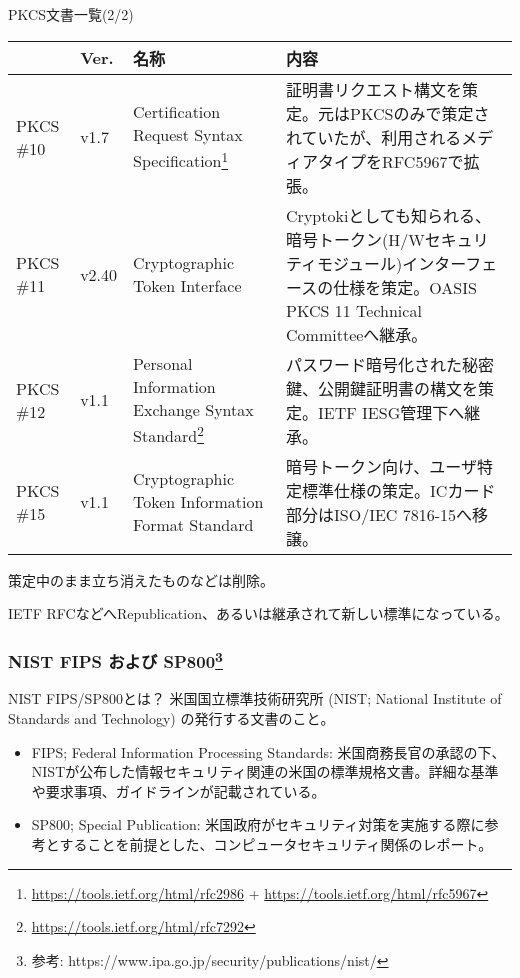 \documentclass[12pt,dvipdfmx]{beamer}
\begin{document}
\begin{frame}
PKCS文書一覧(2/2)
\begin{table}
\scriptsize
\begin{tabular}{|l|l|p{21ex}|p{40ex}|}
\hline
 & Ver. & 名称 & 内容 \\
\hline\hline
PKCS \#10 & v1.7 & Certification Request Syntax Specification\footnote[frame]{\scriptsize \url{https://tools.ietf.org/html/rfc2986} + \url{https://tools.ietf.org/html/rfc5967}} & 証明書リクエスト構文を策定。元はPKCSのみで策定されていたが、利用されるメディアタイプをRFC5967で拡張。\\
\hline
PKCS \#11 & v2.40 & Cryptographic Token Interface & Cryptokiとしても知られる、暗号トークン(H/Wセキュリティモジュール)インターフェースの仕様を策定。OASIS PKCS 11 Technical Committeeへ継承。\\
\hline
PKCS \#12 & v1.1 & Personal Information Exchange Syntax Standard\footnote[frame]{\scriptsize \url{https://tools.ietf.org/html/rfc7292}} & パスワード暗号化された秘密鍵、公開鍵証明書の構文を策定。IETF IESG管理下へ継承。\\
\hline
PKCS \#15 & v1.1 & Cryptographic Token Information Format Standard & 暗号トークン向け、ユーザ特定標準仕様の策定。ICカード部分はISO/IEC 7816-15へ移譲。\\
\hline
\end{tabular}
\end{table}
策定中のまま立ち消えたものなどは削除。

IETF RFCなどへRepublication、あるいは継承されて新しい標準になっている。
\end{frame}

\begin{frame}
\frametitle{NIST FIPS および SP800\footnote[frame]{参考: https://www.ipa.go.jp/security/publications/nist/}}
\begin{block}{NIST FIPS/SP800とは？}
米国国立標準技術研究所 (NIST; National Institute of Standards and Technology) の発行する文書のこと。
\begin{itemize}
 \item \alert{FIPS; Federal Information Processing Standards}: 米国商務長官の承認の下、NISTが公布した情報セキュリティ関連の米国の標準規格文書。詳細な基準や要求事項、ガイドラインが記載されている。
 \item SP800; Special Publication: 米国政府がセキュリティ対策を実施する際に参考とすることを前提とした、コンピュータセキュリティ関係のレポート。
\end{itemize}
\end{block}
\end{frame}
\end{document}
